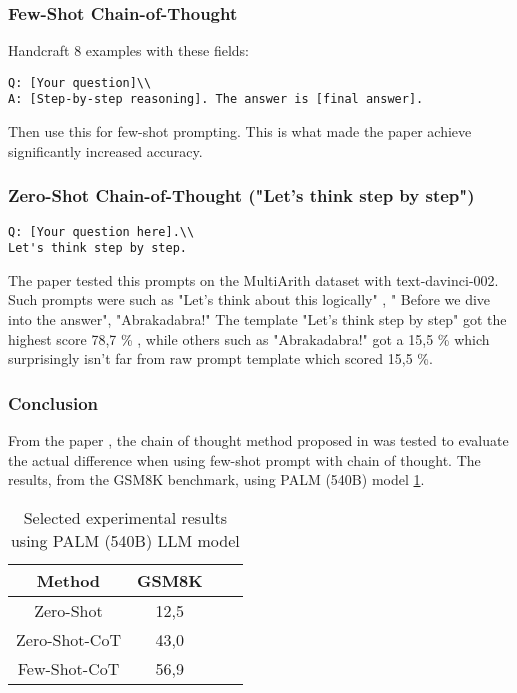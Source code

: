 \subsubsection{Few-Shot Chain-of-Thought \cite{chainofthought}}
\label{subsec:Few-ShotCoT}
Handcraft 8 examples with these fields:

\begin{lstlisting}[language={},basicstyle=\ttfamily\footnotesize,caption={Few-Shot Chain-of-Thought Prompt Template}]
Q: [Your question]\\
A: [Step-by-step reasoning]. The answer is [final answer].
\end{lstlisting}

Then use this for few-shot prompting. This is what made the paper achieve significantly increased accuracy.

\subsubsection{Zero-Shot Chain-of-Thought ("Let's think step by step") \cite{chainofzero}}
\begin{lstlisting}[language={},basicstyle=\ttfamily\footnotesize,caption={Zero-Shot Chain-of-Thought Prompt Template}]
Q: [Your question here].\\
Let's think step by step.
\end{lstlisting}

The paper \cite{chainofzero} tested this prompts on the MultiArith dataset with text-davinci-002. Such prompts were such as "Let's think about this logically" , " Before we dive into the answer", "Abrakadabra!"
The template "Let's think step by step" got the highest score 78,7 \% , while others such as "Abrakadabra!" got a 15,5 \% which surprisingly isn't far from raw prompt template which scored 15,5 \%.

\subsubsection{Conclusion}
From the paper \cite{chainofzero}, the chain of thought method proposed in \cite{chainofthought} was tested to evaluate the actual difference when using few-shot prompt with chain of thought.
The results, from the GSM8K benchmark, using PALM (540B) model \ref{tab:chainofzero}.

\begin{table}[h!]
    \centering
    \begin{tabular}{|c|c|cc}
        \hline
        Method & GSM8K\\
        \hline
        Zero-Shot & 12,5 \\
        \hline
        Zero-Shot-CoT \cite{chainofzero} & 43,0 \\
        \hline
        Few-Shot-CoT \cite{chainofthought} & 56,9 \\
        \hline
    \end{tabular}
    \caption{Selected experimental results using PALM (540B) \gls{LLM} model \cite{chainofzero}}
    \label{tab:chainofzero}
\end{table}

